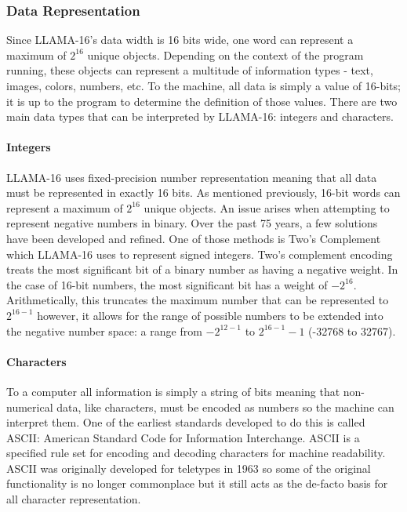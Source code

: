 \documentclass[man,hidelinks,floatsintext]{apa7}
\begin{document}
\subsubsection{Data Representation}
\label{sec:datarep}
Since LLAMA-16's data width is 16 bits wide, one word can represent a maximum of $2^{16}$ unique objects. Depending on the context of the program running, these objects can represent a multitude of information types - text, images, colors, numbers, etc. To the machine, all data is simply a value of 16-bits; it is up to the program to determine the definition of those values. There are two main data types that can be interpreted by LLAMA-16: integers and characters.
\paragraph{Integers}
LLAMA-16 uses fixed-precision number representation meaning that all data must be represented in exactly 16 bits. As mentioned previously, 16-bit words can represent a maximum of $2^{16}$ unique objects. An issue arises when attempting to represent negative numbers in binary. Over the past 75 years, a few solutions have been developed and refined. One of those methods is Two's Complement which LLAMA-16 uses to represent signed integers. Two's complement encoding treats the most significant bit of a binary number as having a negative weight. In the case of 16-bit numbers, the most significant bit has a weight of $-2^{16}$. Arithmetically, this truncates the maximum number that can be represented to $2^{16-1}$ however, it allows for the range of possible numbers to be extended into the negative number space: a range from $-2^{12-1}$ to $2^{16-1}-1$ (-32768 to 32767).
\paragraph{Characters}
To a computer all information is simply a string of bits meaning that non-numerical data, like characters, must be encoded as numbers so the machine can interpret them. One of the earliest standards developed to do this is called ASCII: American Standard Code for Information Interchange. ASCII is a specified rule set for encoding and decoding characters for machine readability. ASCII was originally developed for teletypes in 1963 so some of the original functionality is no longer commonplace but it still acts as the de-facto basis for all character representation.
\end{document}
